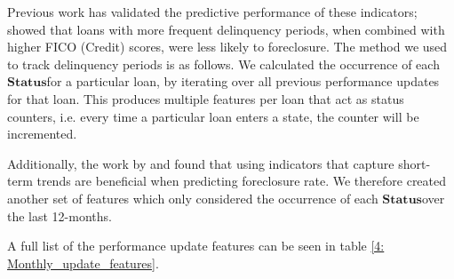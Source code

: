             Previous work has validated the predictive performance of these indicators; \citeauthor{default_risk_2005} showed that loans with more frequent delinquency periods, when combined with higher FICO (Credit) scores, were less likely to foreclosure. The method we used to track delinquency periods is as follows. We calculated the occurrence of each $\textbf{Status}$ for a particular loan, by iterating over all previous performance updates for that loan. This produces multiple features per loan that act as status counters, i.e. every time a particular loan enters a state, the counter will be incremented. 
            
            
            Additionally, the work by \cite{default_risk_2011} and \cite{mortgage_risk} found that using indicators that capture short-term trends are beneficial when predicting foreclosure rate. We therefore created another set of features which only considered the occurrence of each $\textbf{Status}$ over the last 12-months. 
            
            A full list of the performance update features can be seen in table \ref{4: Monthly_update_features}. 

            
            
